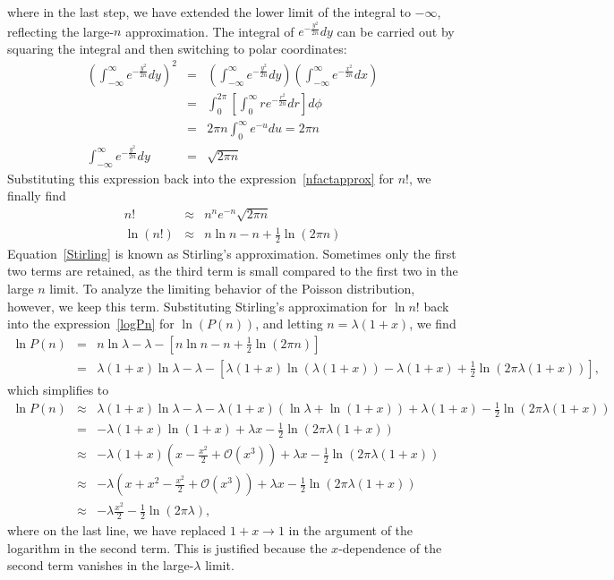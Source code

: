 \documentclass{revtex4}
\begin{document}
where in the last step, we have extended the lower limit of the
integral to $-\infty$, reflecting the large-$n$ approximation. The
integral of $e^{-\frac{y^2}{2n}} dy$ can be carried out by squaring
the integral and then switching to polar coordinates:
\begin{eqnarray}
  \left( \int_{-\infty}^\infty e^{-\frac{y^2}{2n}} dy\right)^2 &=& \left(
    \int_{-\infty}^\infty e^{-\frac{y^2}{2n}} dy \right)\left( \int_{-\infty}^\infty
    e^{-\frac{x^2}{2n}} dx \right) \nonumber \\
  &=& \int_0^{2\pi} \left[\int_0^\infty r e^{-\frac{r^2}{2n}} dr
  \right] d\phi \nonumber \\
  &=& 2\pi n \int_0^\infty e^{-u} du = 2\pi n \nonumber \\
  \int_{-\infty}^{\infty} e^{-\frac{y^2}{2n}} dy &=& \sqrt{2\pi n}
\end{eqnarray} 
Substituting this expression back into the
expression~\eqref{nfactapprox} for $n!$, we finally find
\begin{eqnarray}
  n! &\approx& n^n e^{-n} \sqrt{2\pi n} \\
  \ln (n!) &\approx & n \ln n - n + \frac{1}{2} \ln (2\pi n) \label{Stirling}
\end{eqnarray}
Equation~\eqref{Stirling} is known as Stirling's
approximation. Sometimes only the first two terms are retained, as the
third term is small compared to the first two in the large $n$
limit. To analyze the limiting behavior of the Poisson distribution,
however, we keep this term. Substituting Stirling's approximation for
$\ln n!$ back into the expression~\eqref{logPn} for $\ln(P(n))$, and
letting $n = \lambda(1+x)$, we
find 
\begin{eqnarray}
  \ln P(n) &=& n \ln \lambda - \lambda - \left[n \ln n - n +
    \frac{1}{2}\ln(2\pi n) \right] \nonumber \\
  &=& \lambda(1+x) \ln \lambda - \lambda -
  \left[\lambda(1+x)\ln(\lambda(1+x)) - \lambda(1+x) + \frac{1}{2} \ln(2\pi\lambda(1+x))\right],
\end{eqnarray}
which simplifies to 
\begin{eqnarray}
  \ln P(n) &\approx& \lambda(1+x)\ln \lambda - \lambda - \lambda(1+x)(\ln \lambda +
  \ln(1+x)) + \lambda(1+x) - \frac{1}{2} \ln(2\pi \lambda(1+x))
  \nonumber \\
  &=& -\lambda(1+x)\ln(1+x) + \lambda x - \frac{1}{2} \ln (2\pi
  \lambda(1+x)) \nonumber \\
  &\approx& -\lambda(1+x)\left(x - \frac{x^2}{2} +
    \mathcal{O}(x^3)\right) + \lambda x - \frac{1}{2} \ln (2\pi
  \lambda(1+x)) \nonumber \\
  &\approx& -\lambda \left(x + x^2 - \frac{x^2}{2} +
    \mathcal{O}(x^3)\right) + \lambda x - \frac{1}{2} \ln(2\pi
  \lambda(1+x)) \nonumber \\
  &\approx & -\lambda \frac{x^2}{2} -\frac{1}{2} \ln(2\pi \lambda),
\end{eqnarray}
where on the last line, we have replaced $1+x \rightarrow 1$ in the
argument of the logarithm in the second term. This is justified
because the $x$-dependence of the second term vanishes in the
large-$\lambda$ limit.
  
\end{document}
